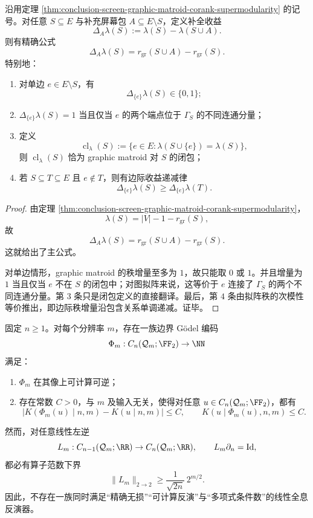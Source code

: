 \begin{theorem}[延迟证书包的相对秩削减律与闭包判据]\label{thm:conclusion-screen-rank-gain-closure-diminishing-returns}
沿用定理 \ref{thm:conclusion-screen-graphic-matroid-corank-supermodularity} 的记号。对任意 \(S\subseteq E\) 与补充屏幕包 \(A\subseteq E\setminus S\)，定义补全收益
\[
\Delta_A\lambda(S):=\lambda(S)-\lambda(S\cup A).
\]
则有精确公式
\[
\Delta_A\lambda(S)=r_{\mathrm{gr}}(S\cup A)-r_{\mathrm{gr}}(S).
\]
特别地：
\begin{enumerate}
  \item 对单边 \(e\in E\setminus S\)，有
        \[
        \Delta_{\{e\}}\lambda(S)\in\{0,1\};
        \]
  \item \(\Delta_{\{e\}}\lambda(S)=1\) 当且仅当 \(e\) 的两个端点位于 \(\Gamma_S\) 的不同连通分量；
  \item 定义
        \[
        \operatorname{cl}_{\lambda}(S):=\{e\in E:\lambda(S\cup\{e\})=\lambda(S)\},
        \]
        则 \(\operatorname{cl}_{\lambda}(S)\) 恰为 graphic matroid 对 \(S\) 的闭包；
  \item 若 \(S\subseteq T\subseteq E\) 且 \(e\notin T\)，则有边际收益递减律
        \[
        \Delta_{\{e\}}\lambda(S)\ge \Delta_{\{e\}}\lambda(T).
        \]
\end{enumerate}
\end{theorem}

\begin{proof}
由定理 \ref{thm:conclusion-screen-graphic-matroid-corank-supermodularity}，
\[
\lambda(S)=|V|-1-r_{\mathrm{gr}}(S),
\]
故
\[
\Delta_A\lambda(S)=r_{\mathrm{gr}}(S\cup A)-r_{\mathrm{gr}}(S).
\]
这就给出了主公式。

对单边情形，graphic matroid 的秩增量至多为 \(1\)，故只能取 \(0\) 或 \(1\)。并且增量为 \(1\) 当且仅当 \(e\) 不在 \(S\) 的闭包中；对图拟阵来说，这等价于 \(e\) 连接了 \(\Gamma_S\) 的两个不同连通分量。第 \(3\) 条只是闭包定义的直接翻译。最后，第 \(4\) 条由拟阵秩的次模性等价推出，即边际秩增量沿包含关系单调递减。证毕。
\end{proof}

\begin{theorem}[算法充分性与度量稳定性的指数分离]\label{thm:conclusion-godel-algorithmic-sufficiency-metric-instability-separation}
固定 \(n\ge 1\)。对每个分辨率 \(m\)，存在一族边界 Gödel 编码
\[
\Phi_m:C_n(\mathcal Q_m;\FF_2)\to\NN
\]
满足：
\begin{enumerate}
  \item \(\Phi_m\) 在其像上可计算可逆；
  \item 存在常数 \(C>0\)，与 \(m\) 及输入无关，使得对任意 \(u\in C_n(\mathcal Q_m;\FF_2)\)，都有
        \[
        \bigl|K(\Phi_m(u)\mid n,m)-K(u\mid n,m)\bigr|\le C,
        \qquad
        K(u\mid \Phi_m(u),n,m)\le C.
        \]
\end{enumerate}
然而，对任意线性左逆
\[
L_m:C_{n-1}(\mathcal Q_m;\RR)\to C_n(\mathcal Q_m;\RR),
\qquad
L_m\partial_n=\mathrm{Id},
\]
都必有算子范数下界
\[
\|L_m\|_{2\to 2}\ge \frac{1}{\sqrt{2n}}\,2^{m/2}.
\]
因此，不存在一族同时满足“精确无损”“可计算反演”与“多项式条件数”的线性全息反演器。
\end{theorem}

